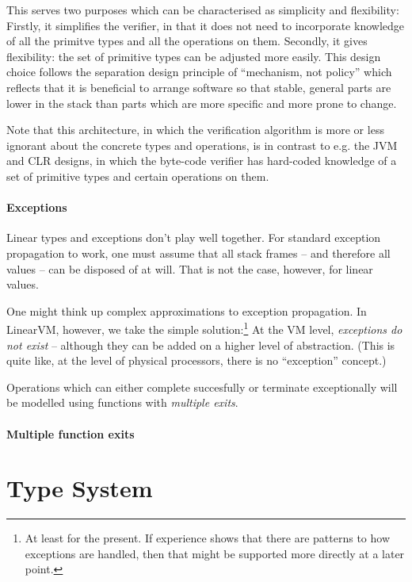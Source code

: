 \documentclass[a4paper]{book}
\begin{document}
This serves two purposes which can be characterised as simplicity and flexibility:
Firstly, it simplifies the verifier, in that it does not need to incorporate
knowledge of all the primitve types and all the operations on them.
Secondly, it gives flexibility: the set of primitive types can be adjusted
more easily.
This design choice follows the separation design principle of ``mechanism,
not policy'' which reflects that it is beneficial to arrange software so
that stable, general parts are lower in the stack than parts which are
more specific and more prone to change.

Note that this architecture, in which the verification algorithm is
more or less ignorant about the concrete types and operations,
is in contrast to e.g. the JVM and CLR designs, in which the
byte-code verifier has hard-coded knowledge of a set of primitive types
and certain operations on them.

\subsection{Exceptions}

Linear types and exceptions don't play well together.
For standard exception propagation to work, one must assume that
all stack frames -- and therefore all values -- can be disposed of at will.
That is not the case, however, for linear values.

One might think up complex approximations to exception propagation.
In LinearVM, however, we take the simple solution:\footnote{
At least for the present. If experience shows that there are patterns to how exceptions are handled, then that might be supported more directly at a later point.}
At the VM level, \emph{exceptions do not exist} -- although they can be added on
a higher level of abstraction.
(This is quite like, at the level of physical processors, there is no
``exception'' concept.)

Operations which can either complete succesfully or terminate exceptionally
will be modelled using functions with \emph{multiple exits}.

\subsection{Multiple function exits}


\part{Type System}
\end{document}

